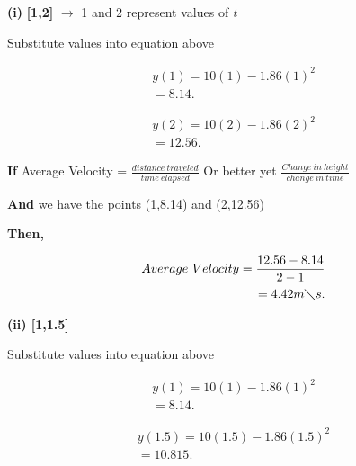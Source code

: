 \documentclass{report}
\begin{document}
    \bigbreak \noindent \bigbreak \noindent  

    \bigbreak \noindent 
    
    \bigbreak \noindent 
    \textbf{(i)} \textbf{[1,2]} $\rightarrow$ 1 and 2 represent values of \textit{t}
    
    \bigbreak \noindent 
    \begin{center}
        Substitute values into equation above
    \end{center}
    \begin{align*}
        y\left(1\right)=10\left(1\right)-1.86\left(1\right)^2 \\
        = 8.14
    .\end{align*}

    \begin{align*}
        y\left(2\right)=10 \left(2\right) - 1.86 \left(2\right) ^2 \\
        = 12.56
    .\end{align*}

    \bigbreak \noindent 
    \textbf{If} Average Velocity = $\frac{distance\ traveled}{time\ elapsed}$ Or better yet
    $ \frac{Change\ in\ height}{change\ in\ time}$

    \bigbreak \noindent 
    \textbf{And} we have the points (1,8.14) and (2,12.56)

    \bigbreak \noindent 
    \textbf{Then,}

    \begin{align*}
        Average\ Velocity = \frac{12.56-8.14}{2-1} \\
        =4.42 m\diagdown s
   .\end{align*}

    \pagebreak
    \textbf{(ii) [1,1.5]}
    
    \begin{center}
        Substitute values into equation above
    \end{center}
    \begin{align*}
        y\left(1\right)=10\left(1\right)-1.86\left(1\right)^2 \\
        = 8.14
    .\end{align*}

    \bigbreak \noindent 
    \begin{align*}
        y \left(1.5\right) = 10 \left(1.5\right) - 1.86 \left(1.5\right) ^2 \\
        =10.815 
    .\end{align*}
\end{document}
